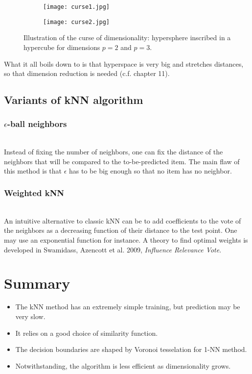 \documentclass[a4paper,12pt]{article}
\begin{document}
\begin{figure}[h]
  \centering
  \begin{subfigure}[c]{0.45\textwidth}
    \texttt{[image: curse1.jpg]}
  \end{subfigure} \hfill
  \begin{subfigure}[c]{0.45\textwidth}
    \texttt{[image: curse2.jpg]}
  \end{subfigure}
\caption{Illustration of the curse of dimensionality: hypersphere inscribed in a hypercube for dimensions $p=2$ and $p=3$.}
\end{figure}


What it all boils down to is that hyperspace is very big and stretches distances, so that dimension reduction is needed (c.f. chapter 11). 

\subsection{Variants of kNN algorithm}

\subsubsection{$\epsilon$-ball neighbors}\\

Instead of fixing the number of neighbors, one can fix the distance of the neighbors that will be compared to the to-be-predicted item. The main flaw of this method is that $\epsilon$ has to be big enough so that no item has no neighbor.

\subsubsection{Weighted kNN}\\

An intuitive alternative to classic kNN can be to add coefficients to the vote of the neighbors as a decreasing function of their distance to the test point. One may use an exponential function for instance. A theory to find optimal weights is developed in Swamidass, Azencott et al. 2009, {\em Influence Relevance Vote}.

\section*{Summary}

\begin{itemize}
\item The kNN method has an extremely simple training, but prediction may be very slow.
\item It relies on a good choice of similarity function.
\item The decision boundaries are shaped by Voronoi tesselation for 1-NN method.
\item Notwithstanding, the algorithm is less efficient as dimensionality grows.
\end{itemize}
\end{document}
